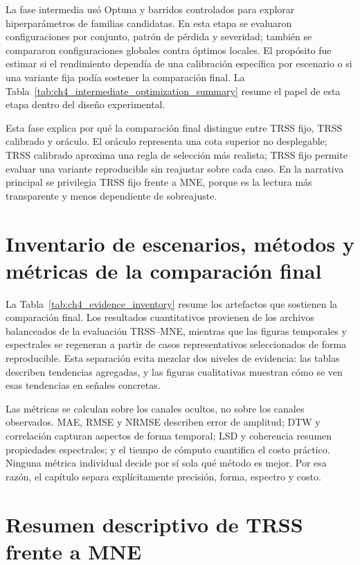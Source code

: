 La fase intermedia usó Optuna y barridos controlados para explorar hiperparámetros de familias candidatas. En esta etapa se evaluaron configuraciones por conjunto, patrón de pérdida y severidad; también se compararon configuraciones globales contra óptimos locales. El propósito fue estimar si el rendimiento dependía de una calibración específica por escenario o si una variante fija podía sostener la comparación final. La Tabla~\ref{tab:ch4_intermediate_optimization_summary} resume el papel de esta etapa dentro del diseño experimental.



Esta fase explica por qué la comparación final distingue entre TRSS fijo, TRSS calibrado y oráculo. El oráculo representa una cota superior no desplegable; TRSS calibrado aproxima una regla de selección más realista; TRSS fijo permite evaluar una variante reproducible sin reajustar sobre cada caso. En la narrativa principal se privilegia TRSS fijo frente a MNE, porque es la lectura más transparente y menos dependiente de sobreajuste.

\section{Inventario de escenarios, métodos y métricas de la comparación final}

La Tabla~\ref{tab:ch4_evidence_inventory} resume los artefactos que sostienen la comparación final. Los resultados cuantitativos provienen de los archivos balanceados de la evaluación TRSS--MNE, mientras que las figuras temporales y espectrales se regeneran a partir de casos representativos seleccionados de forma reproducible. Esta separación evita mezclar dos niveles de evidencia: las tablas describen tendencias agregadas, y las figuras cualitativas muestran cómo se ven esas tendencias en señales concretas.



Las métricas se calculan sobre los canales ocultos, no sobre los canales observados. MAE, RMSE y NRMSE describen error de amplitud; DTW y correlación capturan aspectos de forma temporal; LSD y coherencia resumen propiedades espectrales; y el tiempo de cómputo cuantifica el costo práctico. Ninguna métrica individual decide por sí sola qué método es mejor. Por esa razón, el capítulo separa explícitamente precisión, forma, espectro y costo.

\section{Resumen descriptivo de TRSS frente a MNE}

